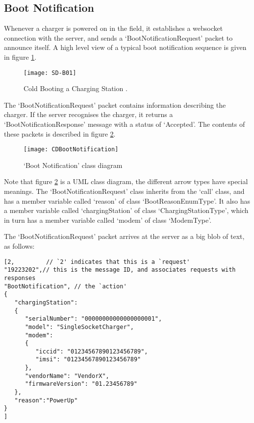 \documentclass[12pt,openany,a4paper]{book}
\begin{document}
\subsection{Boot Notification}
Whenever a charger is powered on in the field, it establishes a websocket connection with the server, and sends a `BootNotificationRequest' packet to announce itself. A high level view of a typical boot notification sequence is given in figure \ref{fig:SD-B01}.

	\begin{center}
		\begin{figure}[H]
			\texttt{[image: SD-B01]}
			\caption{Cold Booting a Charging Station \cite{ocpp2b}.}
			\label{fig:SD-B01}
		\end{figure}
	\end{center}
	
The `BootNotificationRequest' packet contains information describing the charger. If the server recognises the charger, it returns a `BootNotificationResponse' message with a status of `Accepted'. The contents of these packets is described in figure \ref{fig:CDBootNotification}.

	\begin{center}
		\begin{figure}[H]
			\texttt{[image: CDBootNotification]}
			\caption{`Boot Notification' class diagram}
			\label{fig:CDBootNotification}
		\end{figure}
	\end{center}
	
Note that figure \ref{fig:CDBootNotification} is a UML class diagram, the different arrow types have special meanings. The `BootNotificationRequest' class inherits from the `call' class, and has a member variable called `reason' of class `BootReasonEnumType'. It also has a member variable called `chargingStation' of class `ChargingStationType', which in turn has a member variable called `modem' of class `ModemType'.

\pagebreak
The `BootNotificationRequest' packet arrives at the server as a big blob of text, as follows:
\begin{verbatim}
[2,	        // `2' indicates that this is a `request'
"19223202",// this is the message ID, and associates requests with responses
"BootNotification", // the `action'
{
   "chargingStation":
   {
      "serialNumber": "00000000000000000001",
      "model": "SingleSocketCharger",
      "modem":
      {
         "iccid": "01234567890123456789",
         "imsi": "01234567890123456789"
      },
      "vendorName": "VendorX",
      "firmwareVersion": "01.23456789"
   },
   "reason":"PowerUp"
}
]
\end{verbatim}
\end{document}
